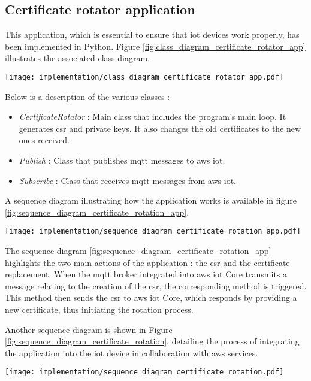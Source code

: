 \subsection{Certificate rotator application}
This application, which is essential to ensure that \acrshort{iot} devices work properly, has been implemented in Python. Figure \ref{fig:class_diagram_certificate_rotator_app} illustrates the associated class diagram.
\begin{center}
    \begingroup
    \texttt{[image: implementation/class\_diagram\_certificate\_rotator\_app.pdf]}
    \label{fig:class_diagram_certificate_rotator_app}
    \endgroup
\end{center}
Below is a description of the various classes :
\begin{itemize}
    \item \textit{CertificateRotator} : Main class that includes the program's main loop. It generates \acrshort{csr} and private keys. It also changes the old certificates to the new ones received.
    \item \textit{Publish} : Class that publishes \acrshort{mqtt} messages to \gls{aws} \acrshort{iot}.
    \item \textit{Subscribe} : Class that receives \acrshort{mqtt} messages from \gls{aws} \acrshort{iot}.
\end{itemize}
A sequence diagram illustrating how the application works is available in figure \ref{fig:sequence_diagram_certificate_rotation_app}.
\begin{center}
    \begingroup
    \texttt{[image: implementation/sequence\_diagram\_certificate\_rotation\_app.pdf]}
    \label{fig:sequence_diagram_certificate_rotation_app}
    \endgroup
\end{center}
The sequence diagram \ref{fig:sequence_diagram_certificate_rotation_app} highlights the two main actions of the application : the \acrfull{csr} and the certificate replacement. When the \acrshort{mqtt} broker integrated into \gls{aws} \acrshort{iot} Core transmits a message relating to the creation of the \acrshort{csr}, the corresponding method is triggered. This method then sends the \acrshort{csr} to \gls{aws} \acrshort{iot} Core, which responds by providing a new certificate, thus initiating the rotation process.

Another sequence diagram is shown in Figure \ref{fig:sequence_diagram_certificate_rotation}, detailing the process of integrating the application into the \acrshort{iot} device in collaboration with \gls{aws} services.
\begin{center}
    \begingroup
    \texttt{[image: implementation/sequence\_diagram\_certificate\_rotation.pdf]}
    \label{fig:sequence_diagram_certificate_rotation}
    \endgroup
\end{center}

